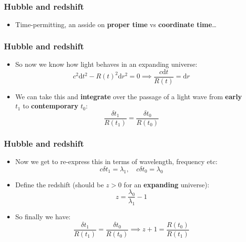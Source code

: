 \documentclass{beamer}
\begin{document}
\begin{frame}
  \frametitle{Hubble and redshift}
  \begin{itemize}
    \item Time-permitting, an asside on \textbf{proper time} vs \textbf{coordinate time}\ldots
  \end{itemize}
\end{frame}

\begin{frame}
  \frametitle{Hubble and redshift}
  \begin{itemize}
    \item So now we know how light behaves in an expanding universe:
      \begin{equation*}
	c^2\mathrm{d}t^2-R(t)^2\mathrm{d}r^2=0 \implies \frac{c\mathrm{d}t}{R(t)}=\mathrm{d}r	
      \end{equation*}
    \item We can take this and \textbf{integrate} over the passage of a light wave from \textbf{early} $t_1$ to \textbf{contemporary} $t_0$:
      \begin{equation*}
	\frac{\delta t_1}{R(t_1)}=\frac{\delta t_0}{R(t_0)}
      \end{equation*}
  \end{itemize}
\end{frame}

\begin{frame}
\frametitle{Hubble and redshift}
  \begin{itemize}
    \item Now we get to re-express this in terms of wavelength, frequency etc:
      \begin{equation*}
	c\delta t_1=\lambda_1, \quad c\delta t_0=\lambda_0	
      \end{equation*}
    \item Define the redshift (should be $z>0$ for an \textbf{expanding} universe):
      \begin{equation*}
	z=\frac{\lambda_0}{\lambda_1}-1	
      \end{equation*}
    \item So finally we have:
      \begin{equation*}
	\frac{\delta t_1}{R(t_1)}=\frac{\delta t_0}{R(t_0)}\implies z+1=\frac{R(t_0)}{R(t_1)}
      \end{equation*}
  \end{itemize}
\end{frame}
\end{document}
